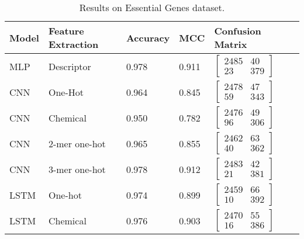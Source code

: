 \begin{longtable}{llllll}
	\caption{Results on Essential Genes dataset.}
	\label{tab:eg_results}
    \endfirsthead
    \endhead
    
	\textbf{Model} & \textbf{Feature Extraction} & \textbf{Accuracy}  & \textbf{MCC} & \textbf{Confusion Matrix}\\\midrule
	
	MLP & Descriptor & 0.978 & 0.911 & 
	$\begin{bmatrix}
        2485 & 40\\ 
        23 & 379
    \end{bmatrix}$
    \\\midrule


    CNN & One-Hot & 0.964 & 0.845 &
	$\begin{bmatrix}
        2478 & 47\\ 
        59 & 343
    \end{bmatrix}$
    \\

    CNN & Chemical & 0.950 & 0.782 &
	$\begin{bmatrix}
        2476 & 49\\ 
        96 & 306
    \end{bmatrix}$
    \\

    CNN & 2-mer one-hot & 0.965 & 0.855 & 
	$\begin{bmatrix}
        2462 & 63\\ 
        40 & 362
    \end{bmatrix}$
    \\

    CNN & 3-mer one-hot & 0.978 & 0.912 & 
	$\begin{bmatrix}
        2483 & 42\\ 
        21 & 381
    \end{bmatrix}$
    \\\midrule


    LSTM & One-hot & 0.974 & 0.899 & 
	$\begin{bmatrix}
        2459 & 66\\ 
        10 & 392
    \end{bmatrix}$
    \\

    LSTM & Chemical & 0.976 & 0.903 & 
	$\begin{bmatrix}
        2470 & 55\\ 
        16 & 386
    \end{bmatrix}$
    \\


\end{longtable}
